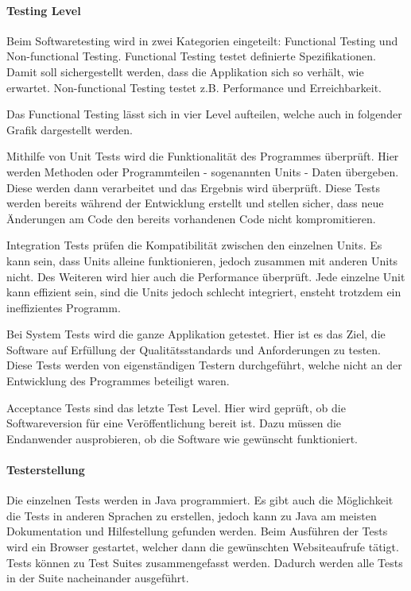 \paragraph{Testing Level}
Beim Softwaretesting wird in zwei Kategorien eingeteilt: Functional Testing und Non-functional Testing. Functional Testing testet definierte Spezifikationen. Damit soll sichergestellt werden, dass die Applikation sich so verhält, wie erwartet. Non-functional Testing testet z.B. Performance und Erreichbarkeit.\cite{TESTING1}

Das Functional Testing lässt sich in vier Level aufteilen, welche auch in folgender Grafik dargestellt werden.


Mithilfe von Unit Tests wird die Funktionalität des Programmes überprüft. Hier werden Methoden oder Programmteilen - sogenannten Units - Daten übergeben. Diese werden dann verarbeitet und das Ergebnis wird überprüft. Diese Tests werden bereits während der Entwicklung erstellt und stellen sicher, dass neue Änderungen am Code den bereits vorhandenen Code nicht kompromitieren. \cite{TESTING3}

\newpage

Integration Tests prüfen die Kompatibilität zwischen den einzelnen Units. Es kann sein, dass Units alleine funktionieren, jedoch zusammen mit anderen Units nicht. Des Weiteren wird hier auch die Performance überprüft. Jede einzelne Unit kann effizient sein, sind die Units jedoch schlecht integriert, ensteht trotzdem ein ineffizientes Programm. \cite{TESTING3}

Bei System Tests wird die ganze Applikation getestet. Hier ist es das Ziel, die Software auf  Erfüllung der Qualitätsstandards und Anforderungen zu testen. Diese Tests werden von eigenständigen Testern durchgeführt, welche nicht an der Entwicklung des Programmes beteiligt waren. \cite{TESTING3}

Acceptance Tests sind das letzte Test Level. Hier wird geprüft, ob die Softwareversion für eine Veröffentlichung bereit ist. Dazu müssen die Endanwender ausprobieren, ob die Software wie gewünscht funktioniert. \cite{TESTING3}

\paragraph{Testerstellung}
Die einzelnen Tests werden in Java programmiert. Es gibt auch die Möglichkeit die Tests in anderen Sprachen zu erstellen, jedoch kann zu Java am meisten Dokumentation und Hilfestellung gefunden werden. Beim Ausführen der Tests wird ein Browser gestartet, welcher dann die gewünschten Websiteaufrufe tätigt. Tests können zu Test Suites zusammengefasst werden. Dadurch werden alle Tests in der Suite nacheinander ausgeführt. 

